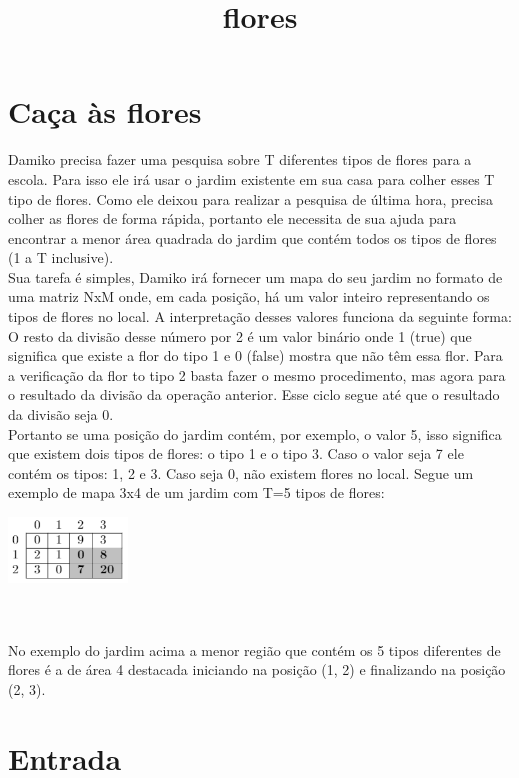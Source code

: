 \documentclass{article}
\title{flores}
\begin{document}
\section{Caça às flores}

Damiko precisa fazer uma pesquisa sobre T diferentes tipos de flores para a escola. Para isso ele irá usar o jardim existente em sua casa para colher esses T tipo de flores. Como ele deixou para realizar a pesquisa de última hora, precisa colher as flores de forma rápida, portanto ele necessita de sua ajuda para encontrar a menor área quadrada do jardim que contém todos os tipos de flores (1 a T inclusive).
\\
Sua tarefa é simples, Damiko irá fornecer um mapa do seu jardim no formato de uma matriz NxM onde, em cada posição, há um valor inteiro representando os tipos de flores no local. A interpretação desses valores funciona da seguinte forma: O resto da divisão desse número por 2 é um valor binário onde 1 (true) que significa que existe a flor do tipo 1 e 0 (false) mostra que não têm essa flor. Para a verificação da flor to tipo 2 basta fazer o mesmo procedimento, mas agora para o resultado da divisão da operação anterior. Esse ciclo segue até que o resultado da divisão seja 0.
\\
Portanto se uma posição do jardim contém, por exemplo, o valor 5, isso significa que existem dois tipos de flores: o tipo 1 e o tipo 3. Caso o valor seja 7 ele contém os tipos:  1, 2 e 3. Caso seja 0, não existem flores no local.
Segue um exemplo de mapa 3x4 de um jardim com T=5 tipos de flores:
\\
\begin{center}
\includegraphics[width=120]{floresTabela.PNG}
\end{center}
\\ \\
No exemplo do jardim acima a menor região que contém os 5 tipos diferentes de flores é a de área 4 destacada iniciando na posição (1, 2) e finalizando na posição (2, 3).

\section*{Entrada}
\end{document}
